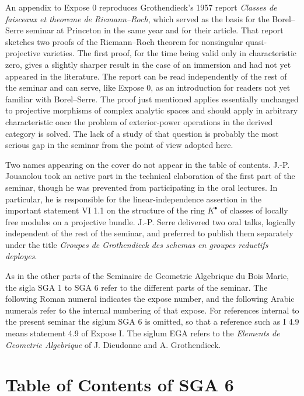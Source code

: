 \documentclass[14pt]{extarticle}
\begin{document}
An appendix to Expose 0 reproduces Grothendieck's 1957 report \emph{Classes de faisceaux et theoreme de Riemann--Roch}, which served as the basis for the Borel--Serre seminar at Princeton in the same year and for their article. That report sketches two proofs of the Riemann--Roch theorem for nonsingular quasi-projective varieties. The first proof, for the time being valid only in characteristic zero, gives a slightly sharper result in the case of an immersion and had not yet appeared in the literature. The report can be read independently of the rest of the seminar and can serve, like Expose 0, as an introduction for readers not yet familiar with Borel--Serre. The proof just mentioned applies essentially unchanged to projective morphisms of complex analytic spaces and should apply in arbitrary characteristic once the problem of exterior-power operations in the derived category is solved. The lack of a study of that question is probably the most serious gap in the seminar from the point of view adopted here.

Two names appearing on the cover do not appear in the table of contents. J.-P. Jouanolou took an active part in the technical elaboration of the first part of the seminar, though he was prevented from participating in the oral lectures. In particular, he is responsible for the linear-independence assertion in the important statement VI 1.1 on the structure of the ring $K^{\bullet}$ of classes of locally free modules on a projective bundle. J.-P. Serre delivered two oral talks, logically independent of the rest of the seminar, and preferred to publish them separately under the title \emph{Groupes de Grothendieck des schemas en groupes reductifs deployes}.

As in the other parts of the Seminaire de Geometrie Algebrique du Bois Marie, the sigla SGA 1 to SGA 6 refer to the different parts of the seminar. The following Roman numeral indicates the expose number, and the following Arabic numerals refer to the internal numbering of that expose. For references internal to the present seminar the siglum SGA 6 is omitted, so that a reference such as I 4.9 means statement 4.9 of Expose I. The siglum EGA refers to the \emph{Elements de Geometrie Algebrique} of J. Dieudonne and A. Grothendieck.

\section*{Table of Contents of SGA 6}
\end{document}
